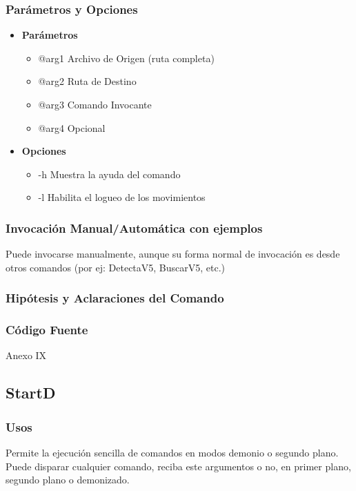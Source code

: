 \documentclass[a4paper,10pt,titlepage]{article}
\begin{document}
		\subsubsection{Par\'ametros y Opciones}
			\begin {itemize}
				\item \textbf{Par\'ametros} {
					\begin{itemize}
						\item {@arg1 }{Archivo de Origen (ruta completa)} 
						\item {@arg2 }{Ruta de Destino } 
						\item {@arg3 }{Comando Invocante} 
						\item {@arg4 }{Opcional} 
					\end{itemize}
				}
				\item \textbf{Opciones}{
					\begin{itemize}
						\item {-h }{Muestra la ayuda del comando} 
						\item {-l }{Habilita el logueo de los movimientos} 
					\end{itemize}
				}
			\end{itemize}
	
		\subsubsection{Invocaci\'on Manual/Autom\'atica con ejemplos}
			Puede invocarse manualmente, aunque su forma normal de invocaci\'on es desde otros comandos (por ej: DetectaV5, BuscarV5, etc.)
			
		\subsubsection{Hip\'otesis y Aclaraciones del Comando}

		\subsubsection{C\'odigo Fuente}
			Anexo IX

	\subsection{StartD}
		\subsubsection{Usos}
			Permite la ejecuci\'on sencilla de comandos en modos demonio o segundo plano. Puede disparar cualquier comando, reciba este argumentos o no, en primer plano, segundo plano o demonizado.
\end{document}
